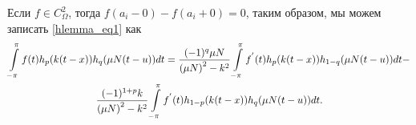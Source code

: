 
\begin{corollary} \label{cor_hlemma}
	Если $f \in C_\Omega^2$, тогда $f(a_i - 0) - f(a_i + 0) = 0$, таким образом, мы можем записать \eqref{hlemma_eq1} как
	\begin{multline*}
	\intop_{-\pi}^{\pi}f(t)h_{p}(k(t-x))h_{q}(\mu N(t-u))dt= 
	\frac{(-1)^{q}\mu N}{\left(\mu N\right)^{2}-k^{2}}\intop_{-\pi}^{\pi}f^{'}(t)h_{p}(k(t-x))h_{1-q}(\mu N(t-u))dt-\\
	\frac{(-1)^{1+p}k}{\left(\mu N\right)^{2}-k^{2}}\intop_{-\pi}^{\pi}f^{'}(t)h_{1-p}(k(t-x))h_{q}(\mu N(t-u))dt.
	\end{multline*}
\end{corollary}

